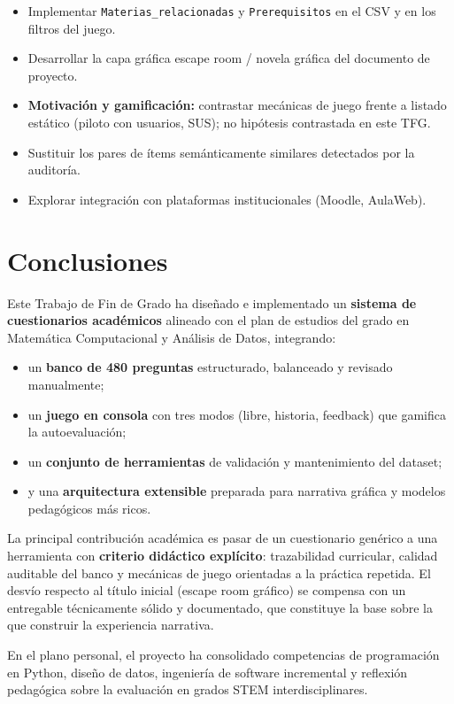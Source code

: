 \documentclass[11pt,a4paper]{article}
\begin{document}
\begin{itemize}
  \item Implementar \texttt{Materias\_relacionadas} y \texttt{Prerequisitos} en el CSV y en los filtros del juego.
  \item Desarrollar la capa gráfica escape room / novela gráfica del documento de proyecto.
  \item \textbf{Motivación y gamificación:} contrastar mecánicas de juego frente a listado estático (piloto con usuarios, SUS); no hipótesis contrastada en este TFG.
  \item Sustituir los pares de ítems semánticamente similares detectados por la auditoría.
  \item Explorar integración con plataformas institucionales (Moodle, AulaWeb).
\end{itemize}

\section{Conclusiones}

Este Trabajo de Fin de Grado ha diseñado e implementado un \textbf{sistema de cuestionarios académicos} alineado con el plan de estudios del grado en Matemática Computacional y Análisis de Datos, integrando:
\begin{itemize}
  \item un \textbf{banco de 480 preguntas} estructurado, balanceado y revisado manualmente;
  \item un \textbf{juego en consola} con tres modos (libre, historia, feedback) que gamifica la autoevaluación;
  \item un \textbf{conjunto de herramientas} de validación y mantenimiento del dataset;
  \item y una \textbf{arquitectura extensible} preparada para narrativa gráfica y modelos pedagógicos más ricos.
\end{itemize}

La principal contribución académica es pasar de un cuestionario genérico a una herramienta con \textbf{criterio didáctico explícito}: trazabilidad curricular, calidad auditable del banco y mecánicas de juego orientadas a la práctica repetida. El desvío respecto al título inicial (escape room gráfico) se compensa con un entregable técnicamente sólido y documentado, que constituye la base sobre la que construir la experiencia narrativa.

En el plano personal, el proyecto ha consolidado competencias de programación en Python, diseño de datos, ingeniería de software incremental y reflexión pedagógica sobre la evaluación en grados STEM interdisciplinares.
\end{document}
